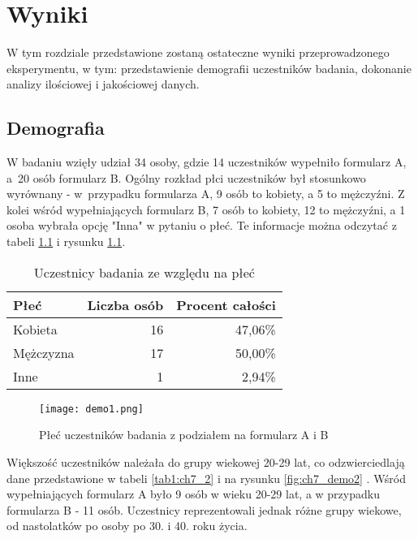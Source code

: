 \graphicspath{{chapters/chapter7/imgs/}}

\chapter{Wyniki}\label{chapter:ch7}

W tym rozdziale przedstawione zostaną ostateczne wyniki przeprowadzonego eksperymentu, w tym: przedstawienie
demografii uczestników badania, dokonanie analizy ilościowej i jakościowej danych.

\section{Demografia}\label{section:ch7_1}

W badaniu wzięły udział 34 osoby, gdzie 14 uczestników wypełniło formularz A, a~20 osób formularz B.
Ogólny rozkład płci uczestników był stosunkowo wyrównany - w~przypadku formularza A, 9 osób to kobiety, a 5 to
mężczyźni. Z kolei wśród wypełniających formularz B, 7 osób to kobiety, 12 to mężczyźni, a 1 osoba wybrała
opcję "Inna" w pytaniu o płeć. Te informacje można odczytać z tabeli \ref{tab1:ch7_1} i rysunku \ref{fig:ch7_demo1}.

\begin{table}[h!]
    \begin{center}
        \begin{tabular}{|l|r|r|}
            \hline
            Płeć      & Liczba osób & Procent całości \\
            \hline
            Kobieta   & 16          & 47,06\%         \\
            Mężczyzna & 17          & 50,00\%         \\
            Inne      & 1           & 2,94\%          \\
            \hline
        \end{tabular}
    \end{center}
    \caption{Uczestnicy badania ze względu na płeć}\label{tab1:ch7_1}
\end{table}

\begin{figure}[h!]
    \centering
    \texttt{[image: demo1.png]}
    \caption{Płeć uczestników badania z podziałem na formularz A i B}
    \label{fig:ch7_demo1}
\end{figure}

\newpage

Większość uczestników należała do grupy wiekowej 20-29 lat, co odzwierciedlają dane przedstawione w
tabeli \ref{tab1:ch7_2} i na rysunku \ref{fig:ch7_demo2} . Wśród wypełniających formularz A było 9 osób
w wieku 20-29 lat, a w przypadku formularza B - 11 osób. Uczestnicy reprezentowali jednak różne grupy
wiekowe, od nastolatków po osoby po 30. i 40. roku życia.

